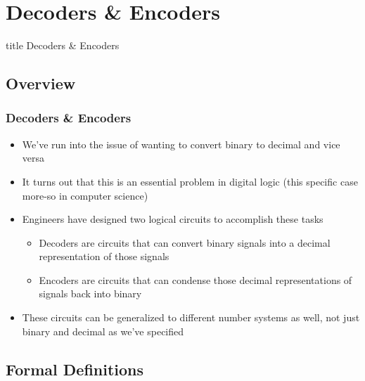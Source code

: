 \documentclass{beamer}
\begin{document}
		
	\section{Decoders \& Encoders}
	
		\begin{frame}
         	\vfill
         	\centering
          	\begin{beamercolorbox}[sep=8pt,center,shadow=true,rounded=true]{title}
           	Decoders \& Encoders\par%
        	\end{beamercolorbox}
            \vfill
       	\end{frame}
       	
       	\subsection{Overview}
       	
       	\begin{frame}
       		\frametitle{Decoders \& Encoders}
       		\begin{itemize}
       			\item We've run into the issue of wanting to convert binary to decimal and vice versa
       			\item It turns out that this is an essential problem in digital logic (this specific case more-so in computer science)
       			\item Engineers have designed two logical circuits to accomplish these tasks
       			\begin{itemize}
       				\item Decoders are circuits that can convert binary signals into a decimal representation of those signals
       				\item Encoders are circuits that can condense those decimal representations of signals back into binary
       			\end{itemize}
       			\item These circuits can be generalized to different number systems as well, not just binary and decimal as we've specified
       		\end{itemize}
       	\end{frame}
       	
       	\subsection{Formal Definitions}
       	
\end{document}
